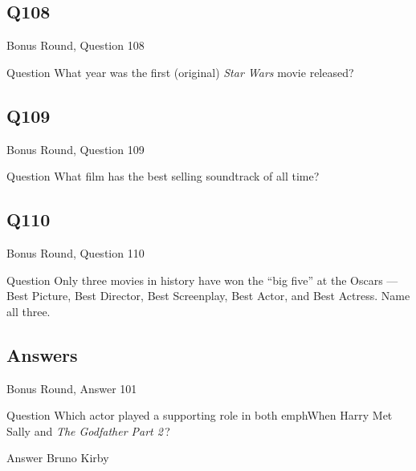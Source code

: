 \documentclass[11pt]{beamer}
\begin{document}
\subsection*{Q108}
\begin{frame}[t]{Bonus Round, Question 108}
\vspace{2em}
\begin{block}{Question}
What year was the first (original) \emph{Star Wars} movie released?
\end{block}
\end{frame}
    

\subsection*{Q109}
\begin{frame}[t]{Bonus Round, Question 109}
\vspace{2em}
\begin{block}{Question}
What film has the best selling soundtrack of all time?
\end{block}
\end{frame}
    

\subsection*{Q110}
\begin{frame}[t]{Bonus Round, Question 110}
\vspace{2em}
\begin{block}{Question}
Only three movies in history have won the ``big five'' at the Oscars — Best Picture, Best Director, Best Screenplay, Best Actor, and Best Actress. Name all three.
\end{block}
\end{frame}
    
\subsection{Answers}

\begin{frame}[t]{Bonus Round, Answer 101}
\vspace{2em}
\begin{block}{Question}
Which actor played a supporting role in both emph{When Harry Met Sally} and \emph{The Godfather Part 2}\,?
\end{block}
\pause{}
\begin{block}{Answer}
Bruno Kirby
\end{block}
\end{frame}
    
\end{document}
